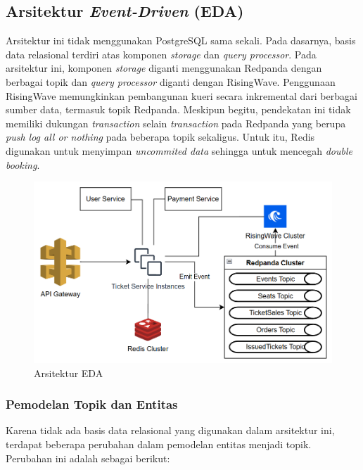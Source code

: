 \subsection{Arsitektur \textit{Event-Driven} (EDA)}

Arsitektur ini tidak menggunakan PostgreSQL sama sekali. Pada dasarnya, basis data relasional terdiri atas komponen \textit{storage} dan \textit{query processor}. Pada arsitektur ini, komponen \textit{storage} diganti menggunakan Redpanda dengan berbagai topik dan \textit{query processor} diganti dengan RisingWave. Penggunaan RisingWave memungkinkan pembangunan kueri secara inkremental dari berbagai sumber data, termasuk topik Redpanda. Meskipun begitu, pendekatan ini tidak memiliki dukungan \textit{transaction} selain \textit{transaction} pada Redpanda yang berupa \textit{push log all or nothing} pada beberapa topik sekaligus. Untuk itu, Redis digunakan untuk menyimpan \textit{uncommited data} sehingga untuk mencegah \textit{double booking}.

\begin{figure}[htbp]
    \centering
    \includegraphics[width=1\textwidth]{resources/appendix/architecture-event-driven.png}
    \caption{Arsitektur EDA}
    \label{fig:solution-event-driven-architecture}
\end{figure}

\subsubsection{Pemodelan Topik dan Entitas}

Karena tidak ada basis data relasional yang digunakan dalam arsitektur ini, terdapat beberapa perubahan dalam pemodelan entitas menjadi topik. Perubahan ini adalah sebagai berikut:


